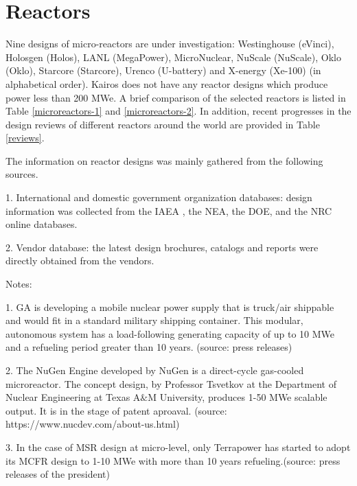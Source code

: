 \section{Reactors} \label{sec:reactors}
Nine designs of micro-reactors are under investigation: Westinghouse (eVinci), Holosgen (Holos), \gls{LANL} (MegaPower), MicroNuclear, NuScale (NuScale), Oklo (Oklo), Starcore (Starcore), Urenco (U-battery) and X-energy (Xe-100) (in alphabetical order). Kairos does not have any reactor designs which produce power less than 200 MWe. A brief comparison of the selected reactors is listed in Table \ref{microreactors-1} and \ref{microreactors-2}. In addition, recent progresses in the design reviews of different reactors around the world are provided in Table \ref{reviews}. 

The information on reactor designs was mainly gathered from the following sources.

1. International and domestic government organization databases: design information was collected from the \gls{IAEA} , the \gls{NEA}, the \gls{DOE}, and the NRC online databases.

2. Vendor database: the latest design brochures, catalogs and reports were directly obtained from the vendors.

Notes:

1. \gls{GA} is developing a mobile nuclear power supply that is truck/air shippable and would fit in a standard military shipping container. This modular, autonomous system has a load-following generating capacity of up to 10 MWe and a refueling period greater than 10 years. (source: press releases)

2. The NuGen Engine developed by NuGen is a direct-cycle gas-cooled microreactor. The concept design, by Professor Tsvetkov at the Department of Nuclear Engineering at Texas A$\&$M University, produces 1-50 MWe scalable output. It is in the stage of patent aproaval. (source: https://www.nucdev.com/about-us.html)

3. In the case of \gls{MSR} design at micro-level, only Terrapower has started to adopt its \gls{MCFR} design to 1-10 MWe with more than 10 years refueling.(source: press releases of the president) 

